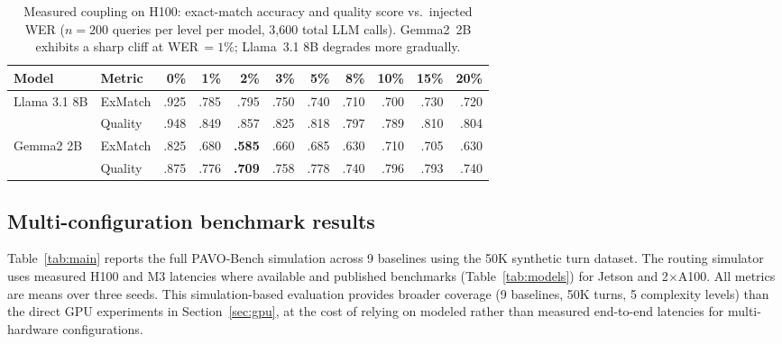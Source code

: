 \documentclass{article}
\begin{document}
\begin{table}[t]
\centering
\caption{Measured coupling on H100: exact-match accuracy and quality score vs.\ injected WER ($n=200$ queries per level per model, 3{,}600 total LLM calls). Gemma2~2B exhibits a sharp cliff at WER$\,=1\%$; Llama~3.1 8B degrades more gradually.}
\label{tab:gpu_coupling}
\small
\begin{tabular}{llrrrrrrrrr}
\toprule
Model & Metric & 0\% & 1\% & 2\% & 3\% & 5\% & 8\% & 10\% & 15\% & 20\% \\
\midrule
\multirow{2}{*}{Llama 3.1 8B}
  & ExMatch & .925 & .785 & .795 & .750 & .740 & .710 & .700 & .730 & .720 \\
  & Quality & .948 & .849 & .857 & .825 & .818 & .797 & .789 & .810 & .804 \\
\midrule
\multirow{2}{*}{Gemma2 2B}
  & ExMatch & .825 & .680 & \textbf{.585} & .660 & .685 & .630 & .710 & .705 & .630 \\
  & Quality & .875 & .776 & \textbf{.709} & .758 & .778 & .740 & .796 & .793 & .740 \\
\bottomrule
\end{tabular}
\end{table}

\subsection{Multi-configuration benchmark results}
\label{sec:benchmark_results}

Table~\ref{tab:main} reports the full PAVO-Bench simulation across 9 baselines using the 50K synthetic turn dataset. The routing simulator uses measured H100 and M3 latencies where available and published benchmarks (Table~\ref{tab:models}) for Jetson and 2$\times$A100. All metrics are means over three seeds. This simulation-based evaluation provides broader coverage (9 baselines, 50K turns, 5 complexity levels) than the direct GPU experiments in Section~\ref{sec:gpu}, at the cost of relying on modeled rather than measured end-to-end latencies for multi-hardware configurations.
\end{document}
